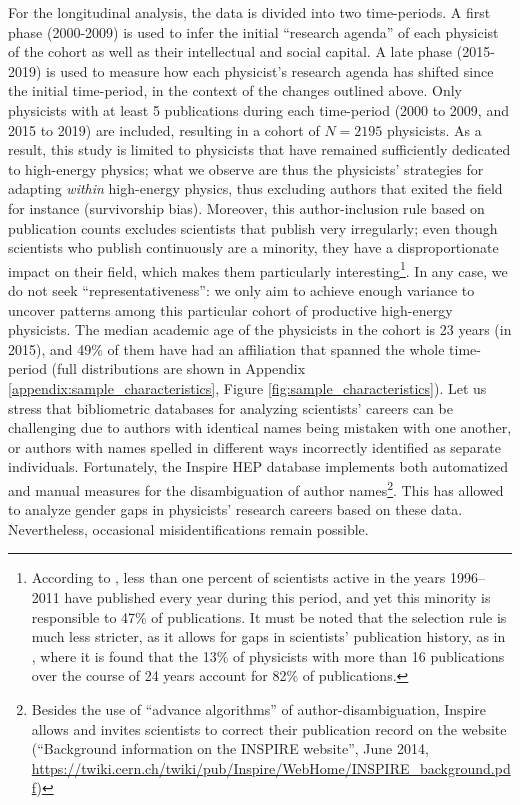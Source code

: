 \documentclass{article}
\begin{document}
For the longitudinal analysis, the data is divided into two time-periods. A first phase (2000-2009) is used to infer the initial ``research agenda'' of each physicist of the cohort as well as their intellectual and social capital. A late phase (2015-2019) is used to measure how each physicist's research agenda has shifted since the initial time-period, in the context of the changes outlined above. Only physicists with at least 5 publications during each time-period (2000 to 2009, and 2015 to 2019) are included, resulting in a cohort of $N=2195$ physicists. As a result, this study is limited to physicists that have remained sufficiently dedicated to high-energy physics; what we observe are thus the physicists' strategies for adapting \textit{within} high-energy physics, thus excluding authors that exited the field for instance (survivorship bias). Moreover, this author-inclusion rule based on publication counts excludes scientists that publish very irregularly; even though scientists who publish continuously are a minority, they have a disproportionate impact on their field, which makes them particularly interesting\footnote{According to  \citet{Ioannidis2014}, less than one percent of scientists active in the years 1996–2011 have published every year during this period, and yet this minority is responsible to 47\% of publications. It must be noted that the selection rule is much less stricter, as it allows for gaps in scientists' publication history, as in \citealt{Feifan2023}, where it is found that the 13\% of physicists with more than 16 publications over the course of 24 years account for 82\% of publications.}. In any case, we do not seek ``representativeness'': we only aim to achieve enough variance to uncover patterns among this particular cohort of productive high-energy physicists. The median academic age of the physicists in the cohort is 23 years (in 2015), and 49\% of them have had an affiliation that spanned the whole time-period (full distributions are shown in Appendix \ref{appendix:sample_characteristics}, Figure \ref{fig:sample_characteristics}). Let us stress that bibliometric databases for analyzing scientists' careers can be challenging due to authors with identical names being mistaken with one another, or authors with names spelled in different ways incorrectly identified as separate individuals. Fortunately, the Inspire HEP database implements both automatized and manual measures for the disambiguation of author names\footnote{Besides the use of ``advance algorithms'' of author-disambiguation, Inspire allows and invites scientists to correct their publication record on the website (``Background	information	on	the	INSPIRE	website'', June 2014, \url{https://twiki.cern.ch/twiki/pub/Inspire/WebHome/INSPIRE_background.pdf})}. %
This has allowed \citet{Strumia2021} to analyze gender gaps in physicists' research careers based on these data. Nevertheless, occasional misidentifications remain possible.
\end{document}
